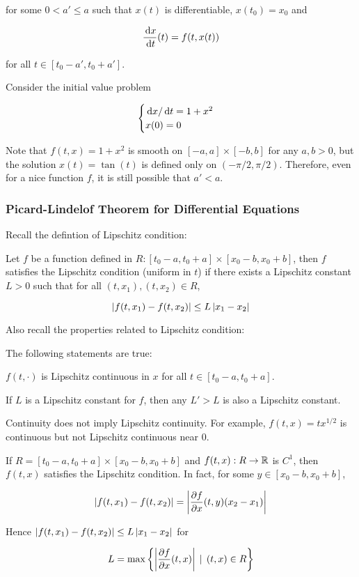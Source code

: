 \documentclass[a4paper,12pt]{article}
\begin{document}
for some $0<a'\leq a$ such that $x(t)$ is differentiable, $x(t_{0})=x_{0}$ and

$$\frac{\,\mathrm{d} x}{\,\mathrm{d} t}(t)=f(t,x(t))$$\s

for all $t\in[t_{0}-a',t_{0}+a']$.\n

\begin{exm}
  Consider the initial value problem

  $$\begin{cases}
    \,\mathrm{d} x/\,\mathrm{d} t=1+x^{2}\\
    x(0)=0
  \end{cases}$$\s

  Note that $f(t,x)=1+x^{2}$ is smooth on $[-a,a]\times[-b,b]$ for any $a,b>0$, but the solution $x(t)=\tan(t)$ is defined only on $(-\pi/2,\pi/2)$. Therefore, even for a nice function $f$, it is still possible that $a'<a$.
\end{exm}

\subsubsection{Picard-Lindelof Theorem for Differential Equations}
Recall the defintion of Lipschitz condition:\n

\begin{dft}
  Let $f$ be a function defined in $R:[t_{0}-a,t_{0}+a]\times[x_{0}-b,x_{0}+b]$, then $f$ satisfies the Lipschitz condition (uniform in $t$) if there exists a Lipschitz constant $L>0$ such that for all $(t,x_{1}),(t,x_{2})\in R$,

  $$\left| f(t,x_{1})-f(t,x_{2})\right|\leq L\left| x_{1}-x_{2}\right|$$
\end{dft}\n

Also recall the properties related to Lipschitz condition:\n

\begin{pst}
  The following statements are true:

  \begin{alist}
    \item $f(t,\cdot)$ is Lipschitz continuous in $x$ for all $t\in[t_{0}-a,t_{0}+a]$.
    \item If $L$ is a Lipschitz constant for $f$, then any $L'>L$ is also a Lipschitz constant.
    \item Continuity does not imply Lipschitz continuity. For example, $f(t,x)=tx^{1/2}$ is continuous but not Lipschitz continuous near $0$.
    \item If $R=[t_{0}-a,t_{0}+a]\times[x_{0}-b,x_{0}+b]$ and $f(t,x):R\to\mathbb{R}$ is $C^{1}$, then $f(t,x)$ satisfies the Lipschitz condition. In fact, for some $y\in[x_{0}-b,x_{0}+b]$,
    
    $$\left| f(t,x_{1})-f(t,x_{2})\right|=\left| \frac{\partial f}{\partial x}(t,y)(x_{2}-x_{1})\right|$$\s

    Hence $\left| f(t,x_{1})-f(t,x_{2})\right|\leq L\left| x_{1}-x_{2}\right|$ for
    
    $$L=\max\left\{ \left| \frac{\partial f}{\partial x}(t,x)\right|\,\mid\, (t,x)\in R\right\}$$
  \end{alist}
\end{pst}\n
\end{document}
